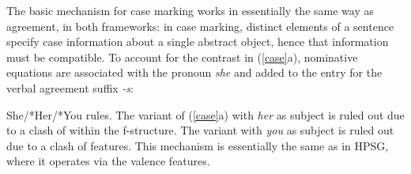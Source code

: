 The basic mechanism for case marking works in essentially the same way as agreement, in both frameworks: in case marking, distinct elements of a sentence specify case information about a single abstract object, hence that information must be compatible.   To account for the contrast in (\ref{case}a), nominative  equations are associated with the pronoun \textit{she} and added to the entry for the verbal agreement suffix \textit{-s}:

\eal 
 \label{case}
\ex She/*Her/*You rules.
 \zl
The variant of (\ref{case}a) with \textit{her} as subject is ruled out due to a clash of   within the \subj{}  f-structure.  The variant with \textit{you} as subject is ruled out due to a clash of  features.  This mechanism is essentially the same as in HPSG, where it operates via the valence features.  

